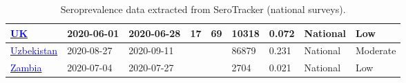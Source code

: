 \begin{table}[ht]
\begin{center}
\begin{tabular}{p{2cm} | p{1.6cm} | p{1.6cm} | p{0.8cm} | p{0.8cm} | p{1cm} | p{1.3cm} | p{1.2cm} | p{1.2cm}}
           \hline 
           \href{https://www.gov.uk/government/publications/national-covid-19-surveillance-reports}{\textcolor{blue}{UK}} & 2020-06-01 & 2020-06-28 & 17 & 69 & 10318 & 0.072 & National & Low \\ 
           \hline 
           \href{https://ejmcm.com/article\_9453.html}{\textcolor{blue}{Uzbekistan}} & 2020-08-27 & 2020-09-11 &  &  & 86879 & 0.231 & National & Moderate \\ 
           \hline 
           \href{https://www.thelancet.com/journals/langlo/article/PIIS2214-109X(21)00053-X/fulltext}{\textcolor{blue}{Zambia}} & 2020-07-04 & 2020-07-27 &  &  & 2704 & 0.021 & National & Low \\ 
           \hline 
           
    \end{tabular}
    \end{center}
    \caption{Seroprevalence data extracted from SeroTracker (national surveys).}
    \label{tab:sero_national}
\end{table}


